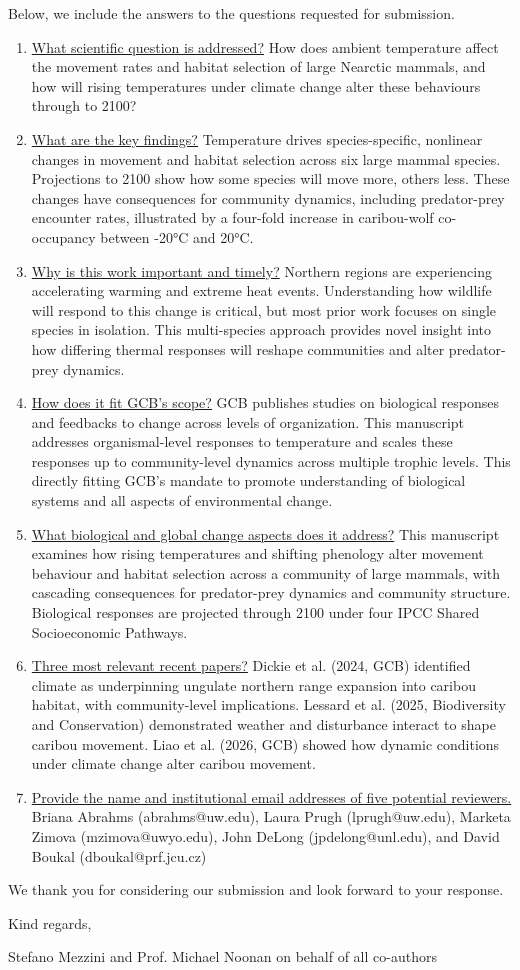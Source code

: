 \documentclass{article}
\begin{document}
Below, we include the answers to the questions requested for submission.

\begin{enumerate}
\item \underline{What scientific question is addressed?} How does ambient temperature affect the movement rates and habitat selection of large Nearctic mammals, and how will rising temperatures under climate change alter these behaviours through to 2100?
\item \underline{What are the key findings?} Temperature drives species-specific, nonlinear changes in movement and habitat selection across six large mammal species. Projections to 2100 show how some species will move more, others less. These changes have consequences for community dynamics, including predator-prey encounter rates, illustrated by a four-fold increase in caribou-wolf co-occupancy between -20°C and 20°C.
\item \underline{Why is this work important and timely?} Northern regions are experiencing accelerating warming and extreme heat events. Understanding how wildlife will respond to this change is critical, but  most prior work focuses on single species in isolation. This multi-species approach provides novel insight into how differing thermal responses will reshape communities and alter predator-prey dynamics.
\item \underline{How does it fit GCB's scope?} GCB publishes studies on biological responses and feedbacks to change across levels of organization. This manuscript addresses organismal-level responses to temperature and scales these responses up to community-level dynamics across multiple trophic levels. This directly fitting GCB's mandate to promote understanding of biological systems and all aspects of environmental change.
\item \underline{What biological and global change aspects does it address?} This manuscript examines how rising temperatures and shifting phenology alter movement behaviour and habitat selection across a community of large mammals, with cascading consequences for predator-prey dynamics and community structure. Biological responses are projected through 2100 under four IPCC Shared Socioeconomic Pathways.
\item \underline{Three most relevant recent papers?} Dickie et al. (2024, GCB) identified climate as underpinning ungulate northern range expansion into caribou habitat, with community-level implications. Lessard et al. (2025, Biodiversity and Conservation) demonstrated weather and disturbance interact to shape caribou movement. Liao et al. (2026, GCB) showed how dynamic conditions under climate change alter caribou movement.
\item \underline{Provide the name and institutional email addresses of five potential reviewers.} Briana Abrahms (abrahms@uw.edu), Laura Prugh (lprugh@uw.edu), Marketa Zimova (mzimova@uwyo.edu), John DeLong (jpdelong@unl.edu), and David Boukal (dboukal@prf.jcu.cz)
\end{enumerate}

We thank you for considering our submission and look forward to your response.

\vspace{10pt}
Kind regards,

Stefano Mezzini and Prof. Michael Noonan on behalf of all co-authors
\end{document}
